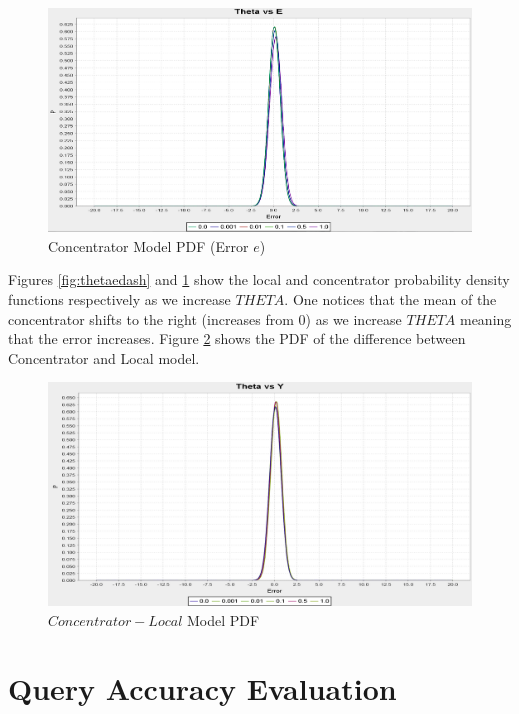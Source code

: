 \documentclass{mproj}
\begin{document}
\begin{figure}[H]
\caption{Concentrator Model PDF (Error $e$)}
\label{fig:thetae}
\centerline{\includegraphics[scale=0.3]{ThetaE}}
\end{figure}

Figures \ref{fig:thetaedash} and \ref{fig:thetae} show the local and concentrator probability density functions respectively as we increase $THETA$. One notices that the mean of the concentrator shifts to the right (increases from 0) as we increase $THETA$ meaning that the error increases. Figure \ref{fig:thetay} shows the PDF of the difference between Concentrator and Local model.

\begin{figure}[H]
\caption{$Concentrator - Local$ Model PDF}
\label{fig:thetay}
\centerline{\includegraphics[scale=0.3]{ThetaY}}
\end{figure}

\section{Query Accuracy Evaluation}
\end{document}
